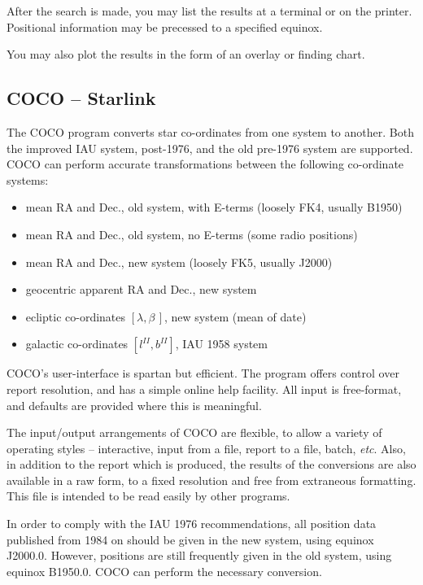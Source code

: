 \documentclass[twoside,11pt]{article}
\newcommand{\htmladdnormallink}[2]{#1}
\newcommand{\xref}[3]{#1}
\newcommand{\xlabel}[1]{}
\newcommand{\COCOref}{\xref{COCO}{sun56}{}}
\newcommand{\STARLINKref}{\htmladdnormallink{Starlink}{http://www.starlink.ac.uk/}}
\begin{document}
After the search is made, you may list the results at a terminal or on the
printer. Positional information may be precessed to a specified equinox.

You may also plot the results in the form of an overlay or finding chart.


\subsection{{\COCOref} -- {\STARLINKref}} \xlabel{COCO}
\label{sec:coco}


The {\COCOref} program converts star co-ordinates from one system to another.  Both
the improved IAU system, post-1976, and the old pre-1976 system are
supported. COCO can perform accurate transformations between the following
co-ordinate systems:

\begin{itemize}
\item mean RA and Dec., old system, with E-terms (loosely FK4, usually B1950)
\item mean RA and Dec., old system, no E-terms (some radio positions)
\item mean RA and Dec., new system (loosely FK5, usually J2000)
\item geocentric apparent RA and Dec., new system
\item ecliptic co-ordinates $[\lambda,\beta\,]$, new system (mean of date)
\item galactic co-ordinates $[l^{II},b^{II}]$, IAU 1958 system
\end{itemize}

{\COCOref}'s user-interface is spartan but efficient.  The program offers control
over report resolution, and has a simple online help facility. All
input is free-format, and defaults are provided where this is meaningful.

The input/output arrangements of COCO are flexible, to allow a variety of
operating styles -- interactive, input from a file, report to a file, batch,
{\it etc}. Also, in addition to the report which is produced, the results of
the conversions are also available in a raw form, to a fixed resolution and
free from extraneous formatting.
This file is intended to be read easily by other programs.

In order to comply with the IAU 1976 recommendations, all position data
published from 1984 on should be given in the new system, using equinox
J2000.0. However, positions are still frequently given in the old system,
using equinox B1950.0. COCO can perform the necessary conversion.
\end{document}
